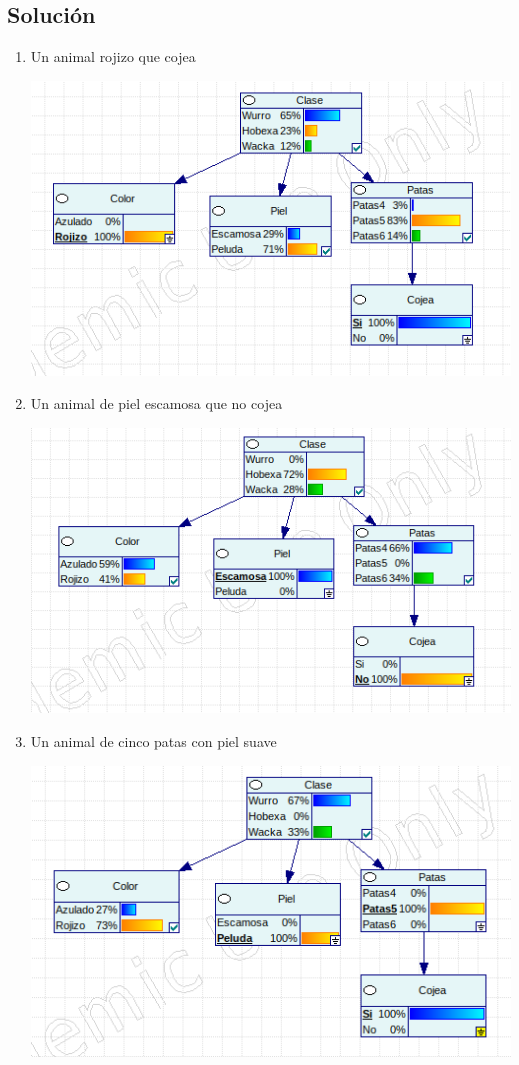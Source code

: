\documentclass{article}
\begin{document}
\newpage

\subsection{Solución}

\begin{enumerate}[label=\alph*)]
\item Un animal rojizo que cojea
\begin{center}
\includegraphics[scale=0.5]{2a.png}
\end{center}
\item Un animal de piel escamosa que no cojea
\begin{center}
\includegraphics[scale=0.5]{2b.png}
\end{center}
\newpage
\item Un animal de cinco patas con piel suave
\begin{center}
\includegraphics[scale=0.5]{2c.png}

\end{center}
\end{enumerate}
\end{document}
